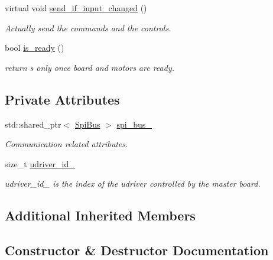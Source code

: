 \begin{DoxyCompactItemize}
virtual void \hyperlink{classblmc__drivers_1_1SpiMotorBoard_a39e986b4df42867f8d5896c35c7c4464}{send\+\_\+if\+\_\+input\+\_\+changed} ()
\begin{DoxyCompactList}\small\item\em Actually send the commands and the controls. \end{DoxyCompactList}\item 
\mbox{\label{classblmc__drivers_1_1SpiMotorBoard_aebd1424f4bee236b2e2ca3bbb1dd8f93}} 
bool \hyperlink{classblmc__drivers_1_1SpiMotorBoard_aebd1424f4bee236b2e2ca3bbb1dd8f93}{is\+\_\+ready} ()
\begin{DoxyCompactList}\small\item\em return s only once board and motors are ready. \end{DoxyCompactList}\end{DoxyCompactItemize}
\subsection*{Private Attributes}
\begin{DoxyCompactItemize}
\item 
std\+::shared\+\_\+ptr$<$ \hyperlink{classblmc__drivers_1_1SpiBus}{Spi\+Bus} $>$ \hyperlink{classblmc__drivers_1_1SpiMotorBoard_a767abb6f687ed8bf7fef873ab892eaf7}{spi\+\_\+bus\+\_\+}
\begin{DoxyCompactList}\small\item\em Communication related attributes. \end{DoxyCompactList}\item 
size\+\_\+t \hyperlink{classblmc__drivers_1_1SpiMotorBoard_a4b865479722dbecec8ebb66d6b93ecae}{udriver\+\_\+id\+\_\+}
\begin{DoxyCompactList}\small\item\em udriver\+\_\+id\+\_\+ is the index of the udriver controlled by the master board. \end{DoxyCompactList}\end{DoxyCompactItemize}
\subsection*{Additional Inherited Members}


\subsection{Constructor \& Destructor Documentation}
\mbox{\label{classblmc__drivers_1_1SpiMotorBoard_a740572d586d73b678a177bc3de351f8b}} 
